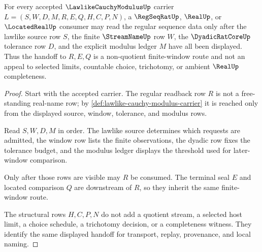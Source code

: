 \begin{theorem}
\label{thm:lawlike-cauchy-modulus-regseqrat-handoff}
For every accepted $\LawlikeCauchyModulusUp$ carrier $L=(S,W,D,M,R,E,Q,H,C,P,N)$, a $\RegSeqRatUp$, $\RealUp$, or $\LocatedRealUp$ consumer may read the regular sequence data only after the lawlike source row $S$, the finite $\StreamNameUp$ row $W$, the $\DyadicRatCoreUp$ tolerance row $D$, and the explicit modulus ledger $M$ have all been displayed. Thus the handoff to $R,E,Q$ is a non-quotient finite-window route and not an appeal to selected limits, countable choice, trichotomy, or ambient $\RealUp$ completeness.
\end{theorem}
\begin{proof}
Start with the accepted carrier. The regular readback row $R$ is not a free-standing real-name row; by \autoref{def:lawlike-cauchy-modulus-carrier} it is reached only from the displayed source, window, tolerance, and modulus rows.

Read $S,W,D,M$ in order. The lawlike source determines which requests are admitted, the window row lists the finite observations, the dyadic row fixes the tolerance budget, and the modulus ledger displays the threshold used for later-window comparison.

Only after those rows are visible may $R$ be consumed. The terminal seal $E$ and located comparison $Q$ are downstream of $R$, so they inherit the same finite-window route.

The structural rows $H,C,P,N$ do not add a quotient stream, a selected host limit, a choice schedule, a trichotomy decision, or a completeness witness. They identify the same displayed handoff for transport, replay, provenance, and local naming.
\end{proof}




